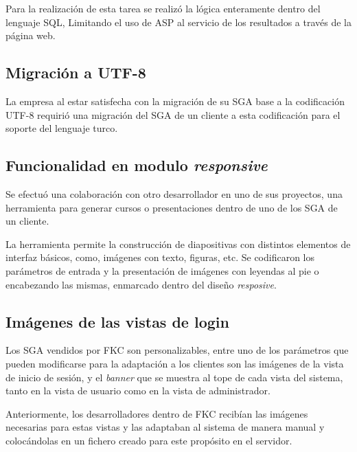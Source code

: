 	Para la realización de esta tarea se realizó la lógica enteramente dentro del lenguaje \gls{SQL}, Limitando el uso de \gls{ASP} al servicio de los resultados a través de la página web.


	\subsection{Migración a UTF-8} %
	\label{sub:migracion_a_utf_8}
	
	La empresa al estar satisfecha con la migración de su \gls{SGA} base a la codificación \gls{UTF-8} requirió una migración del \gls{SGA} de un cliente a esta codificación para el soporte del lenguaje turco.

	\subsection{Funcionalidad en modulo \emph{responsive}} %
	\label{sub:funcionalidad_en_modulo_responsive}
	
	Se efectuó una colaboración con otro desarrollador en uno de sus proyectos, una herramienta para generar cursos o presentaciones dentro de uno de los \gls{SGA} de un cliente.

	La herramienta permite la construcción de diapositivas con distintos elementos de interfaz básicos, como, imágenes con texto, figuras, etc. Se codificaron los parámetros de entrada y la presentación de imágenes con leyendas al pie o encabezando las mismas, enmarcado dentro del diseño \emph{resposive}.


	\subsection{Imágenes de las vistas de login} %
	\label{sub:imagenes_de_las_vistas_de_login}
	
	Los \gls{SGA} vendidos por \gls{FKC} son personalizables, entre uno de los parámetros que pueden modificarse para la adaptación a los clientes son las imágenes de la vista de inicio de sesión, y el \emph{banner} que se muestra al tope de cada vista del sistema, tanto en la vista de usuario como en la vista de administrador.

	Anteriormente, los desarrolladores dentro de \gls{FKC} recibían las imágenes necesarias para estas vistas y las adaptaban al sistema de manera manual y colocándolas en un fichero creado para este propósito en el servidor.

